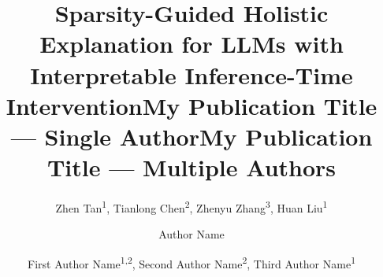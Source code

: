 \documentclass[letterpaper]{article} %
\title{Sparsity-Guided Holistic Explanation for LLMs with\\ Interpretable Inference-Time Intervention}
\author{
   Zhen Tan\textsuperscript{\rm 1}, Tianlong Chen\textsuperscript{\rm 2}, Zhenyu Zhang\textsuperscript{\rm 3}, Huan Liu\textsuperscript{\rm 1}
}
\title{My Publication Title --- Single Author}
\author {
    Author Name
}
\title{My Publication Title --- Multiple Authors}
\author {
    First Author Name\textsuperscript{\rm 1,\rm 2},
    Second Author Name\textsuperscript{\rm 2},
    Third Author Name\textsuperscript{\rm 1}
}
\begin{document}
\maketitle

\begin{abstract}


\end{abstract}
\end{document}
